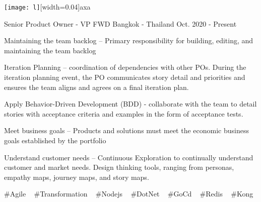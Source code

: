 

\begin{cventries}


    \texttt{[image: l]}[width=0.04\textwidth]{axa}


  \cventry
    {Senior Product Owner - VP} %
    {FWD} %
    {Bangkok - Thailand} %
    {Oct. 2020 - Present} %
    {
      \begin{cvitems} %
        \item {Maintaining the team backlog – Primary responsibility for building, editing, and maintaining the team backlog}
        \item {Iteration Planning – coordination of dependencies with other POs. During the iteration planning event, the PO communicates story detail and priorities and ensures the team aligns and agrees on a final iteration plan.}
        \item {Apply Behavior-Driven Development (BDD) - collaborate with the team to detail stories with acceptance criteria and examples in the form of acceptance tests.}
        \item {Meet business goals – Products and solutions must meet the economic business goals established by the portfolio}
        \item {Understand customer needs – Continuous Exploration to continually understand customer and market needs. Design thinking tools, ranging from personas, empathy maps, journey maps, and story maps.}
      \end{cvitems}
    }
    {
      \#Agile ~
      \#Transformation ~
      \#Nodejs ~
      \#DotNet ~
      \#GoCd ~
      \#Redis ~
      \#Kong ~
    }


\end{cventries}
